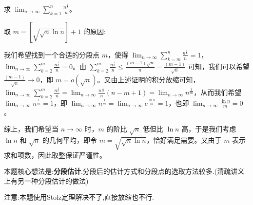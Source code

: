 \documentclass[lang=cn,newtx,10pt,scheme=chinese]{elegantbook}
\begin{document}
\begin{example}
求 \(\lim_{n\rightarrow \infty}\sum_{k = 1}^n\frac{n^{\frac{1}{k}}}{n}\)。


\end{example}
\begin{remark}
\hypertarget{取m的原因}{取 \(m = [\sqrt{\sqrt{n}\ln n}]+1\) 的原因:}我们希望找到一个合适的分段点 \(m\)，使得 \(\lim_{n\rightarrow \infty}\sum_{k = m}^n\frac{n^{\frac{1}{k}}}{n}=1\)，\(\lim_{n\rightarrow \infty}\sum_{k = 2}^m\frac{n^{\frac{1}{k}}}{n}=0\)。由 \(\sum_{k = 2}^m\frac{n^{\frac{1}{k}}}{n}\leqslant \frac{(m - 1)\sqrt{n}}{n}=\frac{(m - 1)}{\sqrt{n}}\) 可知，我们可以希望 \(\frac{(m - 1)}{\sqrt{n}}\rightarrow 0\)，即 \(m = o(\sqrt{n})\)。又由上述证明的积分放缩可知，\(\lim_{n\rightarrow \infty}\sum_{k = 2}^m\frac{n^{\frac{1}{k}}}{n}=\lim_{n\rightarrow \infty}\frac{n^{\frac{1}{m}}}{n}(n - m + 1)=\lim_{n\rightarrow \infty}n^{\frac{1}{m}}\)，从而我们希望 \(\lim_{n\rightarrow \infty}n^{\frac{1}{m}}=1\)，即 \(\lim_{n\rightarrow \infty}n^{\frac{1}{m}}=\lim_{n\rightarrow \infty}e^{\frac{\ln n}{m}}=1\)，也即 \(\lim_{n\rightarrow \infty}\frac{\ln n}{m}=0\)。

综上，我们希望当 \(n\rightarrow \infty\) 时，\(m\) 的阶比 \(\sqrt{n}\) 低但比 \(\ln n\) 高，于是我们考虑 \(\ln n\) 和 \(\sqrt{n}\) 的几何平均，即令 \(m=\sqrt{\sqrt{n}\ln n}\)，恰好满足需要。又由于 \(m\) 表示求和项数，因此取整保证严谨性。
\end{remark}
\begin{note}
本题核心想法是:\textbf{分段估计}.分段后的估计方式和分段点的选取方法较多.(清疏讲义上有另一种分段估计的做法)

注意:本题使用Stolz定理解决不了,直接放缩也不行.
\end{note}
\end{document}
